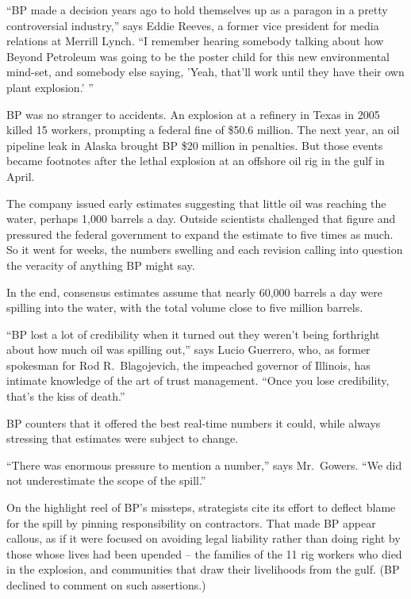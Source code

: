 ﻿\documentclass[12pt]{article}
\begin{document}
``BP made a decision years ago to hold themselves up as a paragon in a pretty controversial
industry,'' says Eddie Reeves, a former vice president for media relations at Merrill Lynch. ``I
remember hearing somebody talking about how Beyond Petroleum was going to be the poster child for
this new environmental mind-set, and somebody else saying, 'Yeah, that'll work until they have their
own plant explosion.' ''

BP was no stranger to accidents. An explosion at a refinery in Texas in 2005 killed 15 workers,
prompting a federal fine of \$50.6 million. The next year, an oil pipeline leak in Alaska brought BP
\$20 million in penalties. But those events became footnotes after the lethal explosion at an
offshore oil rig in the gulf in April.

The company issued early estimates suggesting that little oil was reaching the water, perhaps 1,000
barrels a day. Outside scientists challenged that figure and pressured the federal government to
expand the estimate to five times as much. So it went for weeks, the numbers swelling and each
revision calling into question the veracity of anything BP might say.

In the end, consensus estimates assume that nearly 60,000 barrels a day were spilling into the
water, with the total volume close to five million barrels.

``BP lost a lot of credibility when it turned out they weren't being forthright about how much oil
was spilling out,'' says Lucio Guerrero, who, as former spokesman for Rod R.~Blagojevich, the
impeached governor of Illinois, has intimate knowledge of the art of trust management. ``Once you
lose credibility, that's the kiss of death.''

BP counters that it offered the best real-time numbers it could, while always stressing that
estimates were subject to change.

``There was enormous pressure to mention a number,'' says Mr.~Gowers. ``We did not underestimate the
scope of the spill.''

On the highlight reel of BP's missteps, strategists cite its effort to deflect blame for the spill
by pinning responsibility on contractors. That made BP appear callous, as if it were focused on
avoiding legal liability rather than doing right by those whose lives had been upended -- the
families of the 11 rig workers who died in the explosion, and communities that draw their
livelihoods from the gulf. (BP declined to comment on such assertions.)
\end{document}
